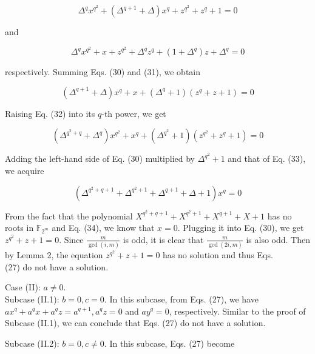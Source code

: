 \documentclass[10pt]{article}
\begin{document}
\begin{equation*}
\Delta^{q} x^{q^{2}}+\left(\Delta^{q+1}+\Delta\right) x^{q}+z^{q^{2}}+z^{q}+1=0 \tag{30}
\end{equation*}


and


\begin{equation*}
\Delta^{q} x^{q^{2}}+x+z^{q^{2}}+\Delta^{q} z^{q}+\left(1+\Delta^{q}\right) z+\Delta^{q}=0 \tag{31}
\end{equation*}


respectively. Summing Eqs. (30) and (31), we obtain


\begin{equation*}
\left(\Delta^{q+1}+\Delta\right) x^{q}+x+\left(\Delta^{q}+1\right)\left(z^{q}+z+1\right)=0 \tag{32}
\end{equation*}


Raising Eq. (32) into its $q$-th power, we get


\begin{equation*}
\left(\Delta^{q^{2}+q}+\Delta^{q}\right) x^{q^{2}}+x^{q}+\left(\Delta^{q^{2}}+1\right)\left(z^{q^{2}}+z^{q}+1\right)=0 \tag{33}
\end{equation*}


Adding the left-hand side of Eq. (30) multiplied by $\Delta^{q^{2}}+1$ and that of Eq. (33), we acquire


\begin{equation*}
\left(\Delta^{q^{2}+q+1}+\Delta^{q^{2}+1}+\Delta^{q+1}+\Delta+1\right) x^{q}=0 \tag{34}
\end{equation*}


From the fact that the polynomial $X^{q^{2}+q+1}+X^{q^{2}+1}+X^{q+1}+X+1$ has no roots in $\mathbb{F}_{2^{m}}$ and Eq. (34), we know that $x=0$. Plugging it into Eq. (30), we get $z^{q^{2}}+z+1=0$. Since $\frac{m}{\operatorname{gcd}(i, m)}$ is odd, it is clear that $\frac{m}{\operatorname{gcd}(2 i, m)}$ is also odd. Then by Lemma 2, the equation $z^{q^{2}}+z+1=0$ has no solution and thus Eqs.\\
(27) do not have a solution.

Case (II): $a \neq 0$.\\
Subcase (II.1): $b=0, c=0$. In this subcase, from Eqs. (27), we have $a x^{q}+a^{q} x+a^{q} z=a^{q+1}, a^{q} z=0$ and $a y^{q}=0$, respectively. Similar to the proof of Subcase (II.1), we can conclude that Eqs. (27) do not have a solution.

Subcase (II.2): $b=0, c \neq 0$. In this subcase, Eqs. (27) become
\end{document}
